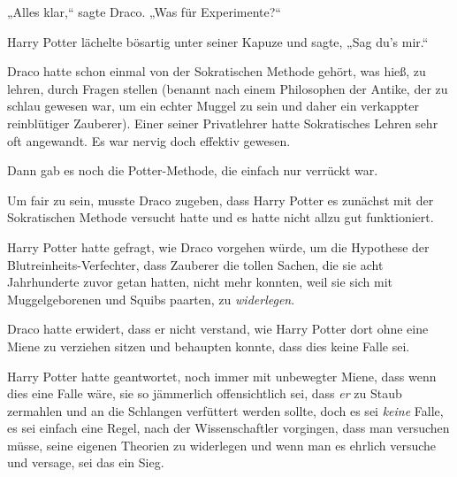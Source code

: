 „Alles klar,“ sagte Draco. „Was für Experimente?“

Harry Potter lächelte bösartig unter seiner Kapuze und sagte, „Sag du's mir.“

\later

Draco hatte schon einmal von der Sokratischen Methode gehört, was hieß, zu lehren, durch Fragen stellen (benannt nach einem Philosophen der Antike, der zu schlau gewesen war, um ein echter Muggel zu sein und daher ein verkappter reinblütiger Zauberer). Einer seiner Privatlehrer hatte Sokratisches Lehren sehr oft angewandt. Es war nervig doch effektiv gewesen.

Dann gab es noch die Potter-Methode, die einfach nur verrückt war.

Um fair zu sein, musste Draco zugeben, dass Harry Potter es zunächst mit der Sokratischen Methode versucht hatte und es hatte nicht allzu gut funktioniert.

Harry Potter hatte gefragt, wie Draco vorgehen würde, um die Hypothese der Blutreinheits-Verfechter, dass Zauberer die tollen Sachen, die sie acht Jahrhunderte zuvor getan hatten, nicht mehr konnten, weil sie sich mit Muggelgeborenen und Squibs paarten, zu \emph{widerlegen}.

Draco hatte erwidert, dass er nicht verstand, wie Harry Potter dort ohne eine Miene zu verziehen sitzen und behaupten konnte, dass dies keine Falle sei.

Harry Potter hatte geantwortet, noch immer mit unbewegter Miene, dass wenn dies eine Falle wäre, sie so jämmerlich offensichtlich sei, dass \emph{er} zu Staub zermahlen und an die Schlangen verfüttert werden sollte, doch es sei \emph{keine} Falle, es sei einfach eine Regel, nach der Wissenschaftler vorgingen, dass man versuchen müsse, seine eigenen Theorien zu widerlegen und wenn man es ehrlich versuche und versage, sei das ein Sieg.

